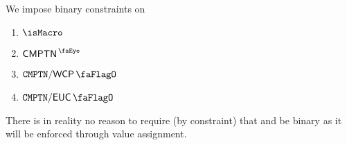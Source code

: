 We impose binary constraints on
\begin{multicols}{2}
	\begin{enumerate}
	\item $\isMacro$
	\item $\isComputation$
	\item $\computationWcpFlag$
	\item $\computationEucFlag$
	\end{enumerate}
\end{multicols}
\saNote{}
There is in reality no reason to require (by constraint) that \txCopyTxcd{} and \isLastTxOfBlock{} be binary as it will be enforced through value assignment.
